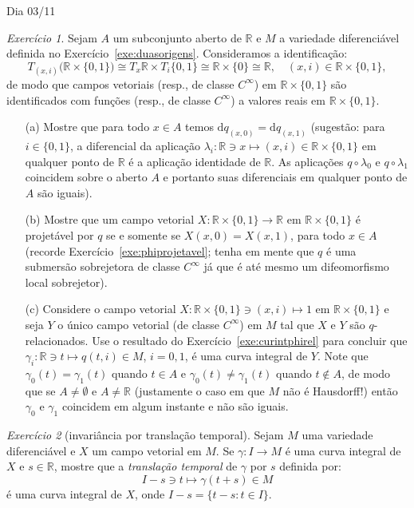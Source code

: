 \documentclass[oneside,11pt]{amsart}
\newcommand{\R}{\mathds R}
\newcommand{\dd}{\mathrm d}
\theoremstyle{remark}\newtheorem{exercise}{Exercício}[section]
\theoremstyle{plain}\newtheorem{teo}{Teorema}[section]
\theoremstyle{plain}\newtheorem{lem}[teo]{Lema}
\theoremstyle{plain}\newtheorem{prop}[teo]{Proposição}
\theoremstyle{definition}\newtheorem{defin}[teo]{Definição}
\theoremstyle{remark}\newtheorem{rem}[teo]{Observação}
\theoremstyle{definition}\newtheorem{example}[teo]{Exemplo}
\numberwithin{equation}{section}
\begin{document}
\begin{section}{Dia 03/11}
\begin{exercise}
Sejam $A$ um subconjunto aberto de $\R$ e $M$ a variedade diferenciável definida no Exercício~\ref{exe:duasorigens}.
Consideramos a identificação:
\[T_{(x,i)}\big(\R\times\{0,1\}\big)\cong T_x\R\times T_i\{0,1\}\cong\R\times\{0\}\cong\R,\quad(x,i)\in\R\times\{0,1\},\]
de modo que campos vetoriais (resp., de classe $C^\infty$) em $\R\times\{0,1\}$ são identificados com funções (resp.,
de classe $C^\infty$) a valores reais em $\R\times\{0,1\}$.
\begin{itemize}
\item[(a)] Mostre que para todo $x\in A$ temos $\dd q_{(x,0)}=\dd q_{(x,1)}$ (sugestão: para $i\in\{0,1\}$,
a diferencial da aplicação $\lambda_i:\R\ni x\mapsto(x,i)\in\R\times\{0,1\}$ em qualquer ponto de $\R$ é a
aplicação identidade de $\R$. As aplicações $q\circ\lambda_0$ e $q\circ\lambda_1$ coincidem sobre o aberto $A$
e portanto suas diferenciais em qualquer ponto de $A$ são iguais).
\item[(b)] Mostre que um campo vetorial $X:\R\times\{0,1\}\to\R$ em $\R\times\{0,1\}$ é projetável por $q$ se e somente se $X(x,0)=X(x,1)$, para todo $x\in A$
(recorde Exercício~\ref{exe:phiprojetavel}; tenha em mente que $q$ é uma submersão sobrejetora de classe $C^\infty$
já que é até mesmo um difeomorfismo local sobrejetor).
\item[(c)] Considere o campo vetorial $X:\R\times\{0,1\}\ni(x,i)\mapsto1$ em $\R\times\{0,1\}$ e seja $Y$ o único campo vetorial (de classe $C^\infty$) em $M$ tal que
$X$ e $Y$ são $q$-relacionados. Use o resultado do Exercício~\ref{exe:curintphirel} para concluir que $\gamma_i:\R\ni t\mapsto q(t,i)\in M$, $i=0,1$,
é uma curva integral de $Y$. Note que $\gamma_0(t)=\gamma_1(t)$ quando $t\in A$ e $\gamma_0(t)\ne\gamma_1(t)$ quando $t\not\in A$, de modo que
se $A\ne\emptyset$ e $A\ne\R$ (justamente o caso em que $M$ não é Hausdorff!) então $\gamma_0$ e $\gamma_1$ coincidem em algum instante e não são iguais.
\end{itemize}
\end{exercise}

\begin{exercise}[invariância por translação temporal]\label{exe:transltemp}
Sejam $M$ uma variedade diferenciável e $X$ um campo vetorial em $M$. Se $\gamma:I\to M$ é uma curva integral de $X$ e
$s\in\R$, mostre que a {\em translação temporal\/} de $\gamma$ por $s$ definida por:
\[I-s\ni t\longmapsto\gamma(t+s)\in M\]
é uma curva integral de $X$, onde $I-s=\big\{t-s:t\in I\big\}$.
\end{exercise}


\end{section}
\end{document}
